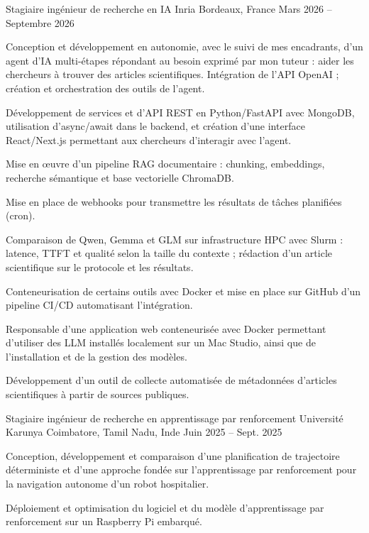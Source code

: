 
\begin{cventries}
  \cventry
    {Stagiaire ingénieur de recherche en IA}
    {Inria}
    {Bordeaux, France}
    {Mars 2026 -- Septembre 2026}
    {
      \begin{cvitems}
        \item {Conception et développement en autonomie, avec le suivi de mes encadrants, d’un agent d’IA multi-étapes répondant au besoin exprimé par mon tuteur : aider les chercheurs à trouver des articles scientifiques. Intégration de l’API OpenAI ; création et orchestration des outils de l’agent.}
        \item {Développement de services et d’API REST en Python/FastAPI avec MongoDB, utilisation d’async/await dans le backend, et création d’une interface React/Next.js permettant aux chercheurs d’interagir avec l’agent.}
        \item {Mise en œuvre d’un pipeline RAG documentaire : chunking, embeddings, recherche sémantique et base vectorielle ChromaDB.}
        \item {Mise en place de webhooks pour transmettre les résultats de tâches planifiées (cron).}
        \item {Comparaison de Qwen, Gemma et GLM sur infrastructure HPC avec Slurm : latence, TTFT et qualité selon la taille du contexte ; rédaction d’un article scientifique sur le protocole et les résultats.}
        \item {Conteneurisation de certains outils avec Docker et mise en place sur GitHub d’un pipeline CI/CD automatisant l’intégration.}
        \item {Responsable d’une application web conteneurisée avec Docker permettant d’utiliser des LLM installés localement sur un Mac Studio, ainsi que de l’installation et de la gestion des modèles.}
        \item {Développement d’un outil de collecte automatisée de métadonnées d’articles scientifiques à partir de sources publiques.}
      \end{cvitems}
    }

  \cventry
    {Stagiaire ingénieur de recherche en apprentissage par renforcement}
    {Université Karunya}
    {Coimbatore, Tamil Nadu, Inde}
    {Juin 2025 -- Sept. 2025}
    {
      \begin{cvitems}
        \item {Conception, développement et comparaison d’une planification de trajectoire déterministe et d’une approche fondée sur l’apprentissage par renforcement pour la navigation autonome d’un robot hospitalier.}
        \item {Déploiement et optimisation du logiciel et du modèle d’apprentissage par renforcement sur un Raspberry Pi embarqué.}
      \end{cvitems}
    }
\end{cventries}
